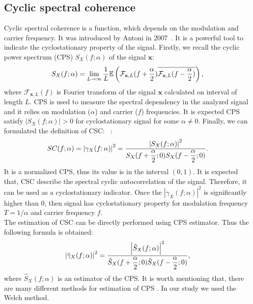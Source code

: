 \documentclass[11pt]{article}
\newcommand{\D}{\displaystyle}
\begin{document}
\subsection{Cyclic spectral coherence}
Cyclic spectral coherence  is a function, which depends on the modulation and carrier frequency. It was introduced by
 Antoni in 2007~\cite{antoni2007cyclic}. It is a powerful tool to indicate the cyclostationary property of the signal.  Firstly, we recall the cyclic power spectrum (CPS) $S_X(f;\alpha)$ of the signal $\mathbf{x}$:
\begin{equation}
\label{eq:CPS}
S_X(f;\alpha)=\lim_{L\to \infty}\D{1\over L}\mathbb{E}\left(\mathcal{F}_{\mathbf{x},L}(f+\D{\alpha \over 2})\overline{\mathcal{F}_{\mathbf{x},L}(f-\D{\alpha \over 2})}\right),
\end{equation}
where $\mathcal{F}_{\mathbf{x},L}(f)$ is Fourier transform of the signal $\mathbf{x}$ calculated on interval of length $L$.
CPS is used to measure the spectral dependency in the analyzed signal and it relies on modulation ($\alpha$) and carrier ($f$) frequencies. It is expected CPS satisfy $\left|S_X(f;\alpha)\right|>0$ for cyclostationary signal for some $\alpha\neq 0$. Finally, we can formulated the definition of CSC:
 ~\cite{antoni2007cyclic}:
\begin{equation}
\label{eq:SC}
SC(f;\alpha)=\left|\gamma_X(f;\alpha)\right|^{2}=\D { \left|S_X(f;\alpha)\right|^2 \over S_X(f+\D{\alpha \over 2};0)S_X(f-\D{\alpha \over 2};0)}.
\end{equation}
It is a normalized CPS, thus its value is in the interval $(0,1)$. It is expected that, CSC describe the spectral cyclic autocorrelation of the signal. Therefore, it can be used as a cyclostationary indicator. Once the $\left|\gamma_X(f;\alpha)\right|^{2}$ is significantly higher than 0, then signal has cyclostationary property for modulation frequency $T=1/\alpha$ and carrier frequency $f$.
\\
The estimation of CSC can be directly performed using CPS estimator. Thus the following formula is obtained:
\begin{equation}
\left|\hat{\gamma}_X(f;\alpha)\right|^{2}=\D { \left|\hat{S}_X(f;\alpha)\right|^2 \over \hat{S}_X(f+\D{\alpha \over 2};0)\hat{S}_X(f-\D{\alpha \over 2};0)},
\end{equation} 
where $\hat{S}_X(f;\alpha)$ is an estimator of the CPS.
It is worth mentioning that, there are many different methods for estimation of CPS \cite{antoni2007cyclic2}. In our study we used the Welch method.
\end{document}
